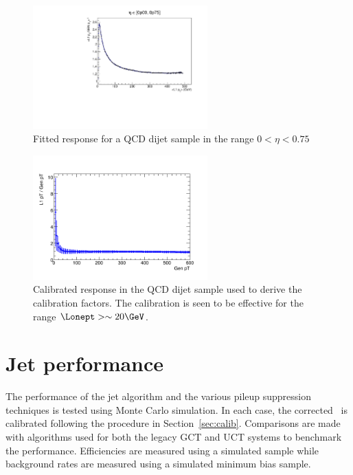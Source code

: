 \begin{figure}
\centering
    \includegraphics[width=0.6\textwidth]{./Figures/triggerUpgrade/calibrationSeed5Chunky}
  \caption{
  Fitted response for a QCD dijet sample in the range $0 < \eta < 0.75$ }
  \label{fig:response}
\end{figure}

\begin{figure}
\centering
    \includegraphics[width=0.6\textwidth]{./Figures/triggerUpgrade/calib_s5_chunky}
  \caption{Calibrated response in the QCD dijet sample used to derive the calibration factors. The calibration is seen to be 
  effective for the range $\Lonept > \sim 20 \GeV$.}
  \label{fig:closure_response}
\end{figure}

\section{Jet performance}
\label{sec:trig_perf}
The performance of the jet algorithm and the various pileup suppression techniques is tested using
Monte Carlo simulation. In each case, the corrected \Lonept~is calibrated following the procedure in Section~\ref{sec:calib}.
Comparisons are made with algorithms used for both the legacy GCT and UCT systems to benchmark the performance.
Efficiencies are measured using a simulated \ttbar sample while 
background rates are measured using a simulated minimum bias sample.

